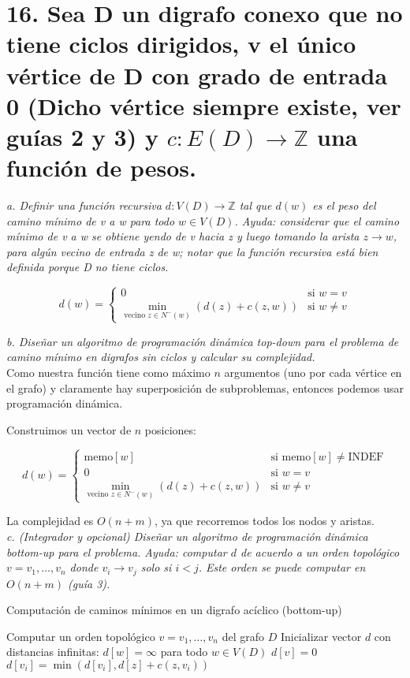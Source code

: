 \documentclass{article}
\begin{document}
\section*{16. Sea D un digrafo conexo que no tiene ciclos dirigidos, v el único vértice de D con grado de entrada 0 (Dicho vértice siempre existe, ver guías 2 y 3) y $c : E(D) \rightarrow \mathbb{Z}$ una función de pesos.}

\textit{a. Definir una función recursiva $d: V(D) \rightarrow \mathbb{Z}$ tal que $d(w)$ es el peso del camino mínimo de v a w para todo $w \in V(D)$. Ayuda: considerar que el camino mínimo de v a w se obtiene yendo de v hacia z y luego tomando la arista $z \rightarrow w$, para algún vecino de entrada z de w; notar que la función recursiva está bien definida porque D no tiene ciclos.}

\[
d(w) = \begin{cases} 
0 & \text{si } w = v \\
\min_{\text{vecino } z \in N^-(w)} \left( d(z) + c(z, w) \right) & \text{si } w \neq v 
\end{cases}
\]

\textit{b. Diseñar un algoritmo de programación dinámica top-down para el problema de camino mínimo en digrafos sin ciclos y calcular su complejidad.} \\

Como nuestra función tiene como máximo $n$ argumentos (uno por cada vértice en el grafo) y claramente hay superposición de subproblemas, entonces podemos usar programación dinámica.

Construimos un vector de $n$ posiciones:

\[
d(w) = \begin{cases}
\text{memo}[w] & \text{si memo}[w] \neq \text{INDEF} \\
0 & \text{si } w = v \\
\min_{\text{vecino } z \in N^-(w)} \left( d(z) + c(z, w) \right) & \text{si } w \neq v
\end{cases}
\]

La complejidad es $O(n +m )$, ya que recorremos todos los nodos y aristas. \\

\textit{c. (Integrador y opcional) Diseñar un algoritmo de programación dinámica bottom-up para el problema. Ayuda: computar $d$ de acuerdo a un orden topológico $v = v_1, \ldots, v_n$ donde $v_i \rightarrow v_j$ solo si $i < j$. Este orden se puede computar en $O(n + m)$ (guía 3).}

\begin{algorithm}
\caption{Computación de caminos mínimos en un digrafo acíclico (bottom-up)}
\label{alg:min_paths}

\begin{algorithmic}[1]
\STATE Computar un orden topológico $v = v_1, \ldots, v_n$ del grafo $D$
\STATE Inicializar vector $d$ con distancias infinitas: $d[w] = \infty$ para todo $w \in V(D)$
\STATE $d[v] = 0$
        \STATE $d[v_i] = \min(d[v_i], d[z] + c(z, v_i))$
    \ENDFOR
\ENDFOR
\end{algorithmic}

\end{algorithm}
\end{document}
